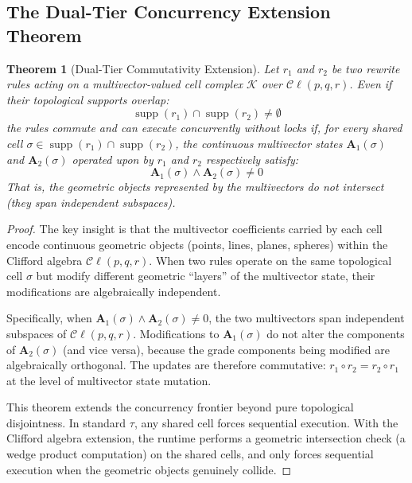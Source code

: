 \documentclass[manuscript, nonacm, review=false]{acmart}
\theoremstyle{definition}
\theoremstyle{plain}
\newtheorem{theorem}{Theorem}[section]
\newcommand{\Cl}{\mathcal{C}\!\ell}
\newcommand{\K}{\mathcal{K}}
\newcommand{\supp}{\operatorname{supp}}
\newcommand{\toposLang}{\ensuremath{\tau}\text{-Lang}}
\begin{document}
\subsection{The Dual-Tier Concurrency Extension Theorem}
\label{subsec:dual_tier_theorem}

\begin{theorem}[Dual-Tier Commutativity Extension]
\label{thm:dual_tier}
Let $r_1$ and $r_2$ be two rewrite rules acting on a multivector-valued cell complex $\K$ over $\Cl(p,q,r)$. Even if their topological supports overlap:
\begin{equation}
    \supp(r_1) \cap \supp(r_2) \neq \emptyset
\end{equation}
the rules commute and can execute concurrently without locks if, for every shared cell $\sigma \in \supp(r_1) \cap \supp(r_2)$, the continuous multivector states $\mathbf{A}_1(\sigma)$ and $\mathbf{A}_2(\sigma)$ operated upon by $r_1$ and $r_2$ respectively satisfy:
\begin{equation}
    \mathbf{A}_1(\sigma) \wedge \mathbf{A}_2(\sigma) \neq 0
\end{equation}
That is, the geometric objects represented by the multivectors do not intersect (they span independent subspaces).
\end{theorem}

\begin{proof}
The key insight is that the multivector coefficients carried by each cell encode continuous geometric objects (points, lines, planes, spheres) within the Clifford algebra $\Cl(p,q,r)$. When two rules operate on the same topological cell $\sigma$ but modify different geometric ``layers'' of the multivector state, their modifications are algebraically independent.

Specifically, when $\mathbf{A}_1(\sigma) \wedge \mathbf{A}_2(\sigma) \neq 0$, the two multivectors span independent subspaces of $\Cl(p,q,r)$. Modifications to $\mathbf{A}_1(\sigma)$ do not alter the components of $\mathbf{A}_2(\sigma)$ (and vice versa), because the grade components being modified are algebraically orthogonal. The updates are therefore commutative: $r_1 \circ r_2 = r_2 \circ r_1$ at the level of multivector state mutation.

This theorem extends the concurrency frontier beyond pure topological disjointness. In standard \toposLang{}, any shared cell forces sequential execution. With the Clifford algebra extension, the runtime performs a geometric intersection check (a wedge product computation) on the shared cells, and only forces sequential execution when the geometric objects genuinely collide.
\end{proof}
\end{document}

